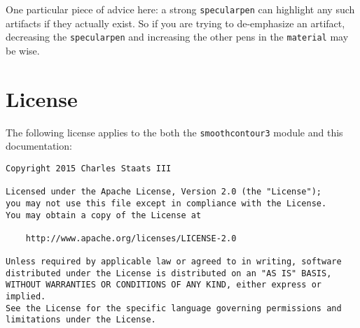 \documentclass{article}
\begin{document}
One particular piece of advice here: a strong \lstinline!specularpen! can 
highlight any such artifacts if they actually exist. So if you are trying to 
de-emphasize an artifact, decreasing the \lstinline!specularpen! and increasing 
the other pens in the \lstinline!material! may be wise.

\section{License}
The following license applies to the both the \lstinline!smoothcontour3! module and this 
documentation:
\begin{verbatim}
Copyright 2015 Charles Staats III

Licensed under the Apache License, Version 2.0 (the "License");
you may not use this file except in compliance with the License.
You may obtain a copy of the License at

    http://www.apache.org/licenses/LICENSE-2.0

Unless required by applicable law or agreed to in writing, software
distributed under the License is distributed on an "AS IS" BASIS,
WITHOUT WARRANTIES OR CONDITIONS OF ANY KIND, either express or implied.
See the License for the specific language governing permissions and
limitations under the License.
\end{verbatim}
\end{document}
